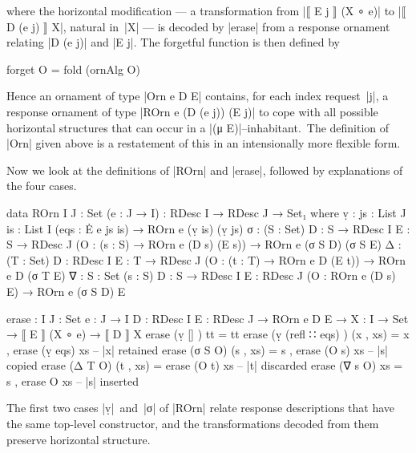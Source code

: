 where the horizontal modification --- a transformation from |⟦ E j ⟧ (X ∘ e)| to |⟦ D (e j) ⟧ X|, natural in~|X| --- is decoded by |erase| from a response ornament relating |D (e j)| and |E j|.
The forgetful function is then defined by
\begin{code}
forget O = fold (ornAlg O)
\end{code}
Hence an ornament of type |Orn e D E| contains, for each index request~|j|, a response ornament of type |ROrn e (D (e j)) (E j)| to cope with all possible horizontal structures that can occur in a |(μ E)|--inhabitant.\
The definition of |Orn| given above is a restatement of this in an intensionally more flexible form.

Now we look at the definitions of |ROrn| and |erase|, followed by explanations of the four cases.
\begin{code}
data ROrn {I J : Set} (e : J → I) : RDesc I → RDesc J → Set₁ where
  ṿ   :  {js : List J} {is : List I} (eqs : Ė e js is) → ROrn e (ṿ is) (ṿ js)
  σ   :  (S : Set) {D : S → RDesc I} {E : S → RDesc J}
         (O : (s : S) → ROrn e (D s) (E s)) → ROrn e (σ S D) (σ S E)
  Δ   :  (T : Set) {D : RDesc I} {E : T → RDesc J}
         (O : (t : T) → ROrn e D (E t)) → ROrn e D (σ T E)
  ∇   :  {S : Set} (s : S) {D : S → RDesc I} {E : RDesc J}
         (O : ROrn e (D s) E) → ROrn e (σ S D) E
           
erase :  {I J : Set} {e : J → I} {D : RDesc I} {E : RDesc J} →
         ROrn e D E → {X : I → Set} → ⟦ E ⟧ (X ∘ e) → ⟦ D ⟧ X
erase (ṿ []            )  tt         = tt
erase (ṿ (refl ∷ eqs)  )  (x ,  xs)  = x  ,  erase (ṿ eqs)  xs  -- |x| retained
erase (σ S O)             (s ,  xs)  = s  ,  erase (O s)    xs  -- |s| copied
erase (Δ T O)             (t ,  xs)  =       erase (O t)    xs  -- |t| discarded
erase (∇ s O)                   xs   = s  ,  erase O        xs  -- |s| inserted
\end{code}
The first two cases |ṿ|~and~|σ| of |ROrn| relate response descriptions that have the same top-level constructor, and the transformations decoded from them preserve horizontal structure.

